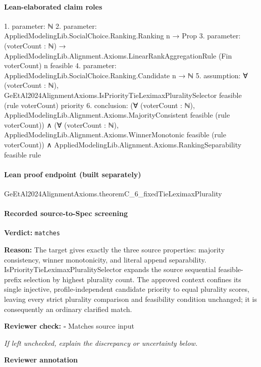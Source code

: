 \documentclass[10pt]{article}
\newcommand{\reviewerbox}{%
  \par\noindent\fbox{\parbox{0.96\linewidth}{\rule{0pt}{0.38in}}}\par
}
\newcommand{\reviewmatch}[1]{%
  \par\noindent\textbf{Reviewer check:} $\square$\; #1\par
  \noindent\emph{If left unchecked, explain the discrepancy or uncertainty below.}\par
}
\begin{document}
\paragraph{Lean-elaborated claim roles}\begin{ReviewVerbatim}
1. parameter: ℕ
2. parameter: AppliedModelingLib.SocialChoice.Ranking.Ranking n → Prop
3. parameter: (voterCount : ℕ) → AppliedModelingLib.Alignment.Axioms.LinearRankAggregationRule (Fin voterCount) n feasible
4. parameter: AppliedModelingLib.SocialChoice.Ranking.Candidate n → ℕ
5. assumption: ∀ (voterCount : ℕ), GeEtAl2024AlignmentAxioms.IsPriorityTieLeximaxPluralitySelector feasible (rule voterCount) priority
6. conclusion: (∀ (voterCount : ℕ), AppliedModelingLib.Alignment.Axioms.MajorityConsistent feasible (rule voterCount)) ∧
  (∀ (voterCount : ℕ), AppliedModelingLib.Alignment.Axioms.WinnerMonotonic feasible (rule voterCount)) ∧
    AppliedModelingLib.Alignment.Axioms.RankingSeparability feasible rule
\end{ReviewVerbatim}

\paragraph{Lean proof endpoint (built separately)}\begin{ReviewVerbatim}
GeEtAl2024AlignmentAxioms.theoremC_6_fixedTieLeximaxPlurality
\end{ReviewVerbatim}

\paragraph{Recorded source-to-Spec screening}
\textbf{Verdict:} \texttt{matches}
\\
{\raggedright
\textbf{Reason:} The target gives exactly the three source properties:\allowbreak{} majority consistency, winner monotonicity, and literal append separability.\allowbreak{}  IsPriorityTieLeximaxPluralitySelector expands the source sequential feasible-\allowbreak{}prefix selection by highest plurality count.\allowbreak{}  The approved context confines its single injective, profile-\allowbreak{}independent candidate priority to equal plurality scores, leaving every strict plurality comparison and feasibility condition unchanged;\allowbreak{} it is consequently an ordinary clarified match.\allowbreak{}
\par}
\reviewmatch{Matches source input}
\noindent\textbf{Reviewer annotation}\par
\reviewerbox
\clearpage
\hypertarget{source-claim-42097890307741b0}{}
\end{document}
